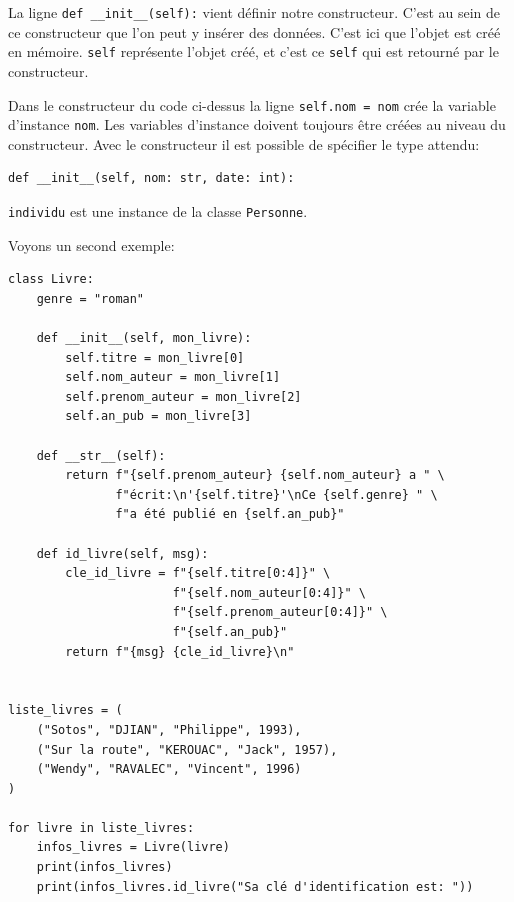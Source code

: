 \documentclass[a4paper,11pt]{book}
\begin{document}
La ligne \texttt{def \_\_init\_\_(self):} vient définir notre constructeur. C'est au sein de ce constructeur que l'on peut  y insérer des données. C'est ici que l'objet est créé en mémoire. \texttt{self} représente l'objet créé, et c'est ce \texttt{self} qui est retourné par le constructeur.
\medskip

Dans le constructeur du code ci-dessus la ligne \texttt{self.nom = nom} crée la variable d'instance \texttt{nom}. Les variables d'instance doivent toujours être créées au niveau du constructeur. Avec le constructeur il est possible de spécifier le type attendu:
\begin{lstlisting}
def __init__(self, nom: str, date: int):
\end{lstlisting}
\medskip

\texttt{individu} est une instance de la classe \texttt{Personne}.
\medskip

Voyons un second exemple:
\begin{lstlisting}[caption=La classe Livre complétée]
class Livre:
    genre = "roman"

    def __init__(self, mon_livre):
        self.titre = mon_livre[0]
        self.nom_auteur = mon_livre[1]
        self.prenom_auteur = mon_livre[2]
        self.an_pub = mon_livre[3]

    def __str__(self):
        return f"{self.prenom_auteur} {self.nom_auteur} a " \
               f"écrit:\n'{self.titre}'\nCe {self.genre} " \
               f"a été publié en {self.an_pub}"

    def id_livre(self, msg):
        cle_id_livre = f"{self.titre[0:4]}" \
                       f"{self.nom_auteur[0:4]}" \
                       f"{self.prenom_auteur[0:4]}" \
                       f"{self.an_pub}"
        return f"{msg} {cle_id_livre}\n"


liste_livres = (
    ("Sotos", "DJIAN", "Philippe", 1993),
    ("Sur la route", "KEROUAC", "Jack", 1957),
    ("Wendy", "RAVALEC", "Vincent", 1996)
)

for livre in liste_livres:
    infos_livres = Livre(livre)
    print(infos_livres)
    print(infos_livres.id_livre("Sa clé d'identification est: "))
\end{lstlisting}
\medskip
\end{document}
